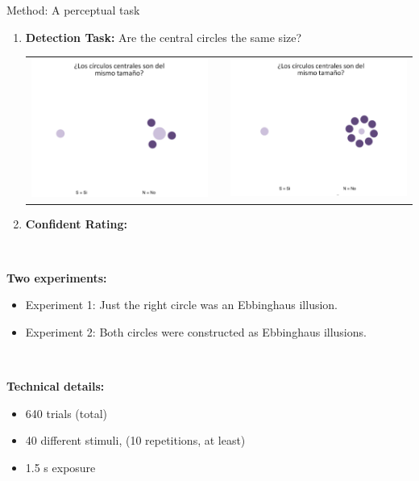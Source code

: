 \documentclass[final]{beamer}
\newlength{\onecolwid}
\begin{document}
\begin{frame}[t]
\begin{columns}[t]
\begin{column}{\onecolwid}
\begin{alertblock}{Method: A perceptual task}
$\quad$
\begin{enumerate}
\item \textbf{Detection Task:} Are the central circles the same size?
\begin{center}
\begin{tabular}{ccc}
\includegraphics[width=0.35\linewidth]{Figures/MainTask.png} & \hfill & \includegraphics[width=0.35\linewidth]{Figures/MainTask2.png}
\end{tabular}
\end{center}
\item \textbf{Confident Rating:}
\end{enumerate}
$\qquad$

\textbf{Two experiments:} 

\begin{itemize}
\item Experiment 1: Just the right circle was an Ebbinghaus illusion.
\item Experiment 2: Both circles were constructed as Ebbinghaus illusions.
\end{itemize}

$\qquad$

\textbf{Technical details:} 

\begin{itemize}
\item 640 trials (total)
\item 40 different stimuli, (10 repetitions, at least)
\item 1.5 s exposure
\end{itemize}
\end{alertblock}


\end{column}
\end{columns}
\end{frame}
\end{document}
